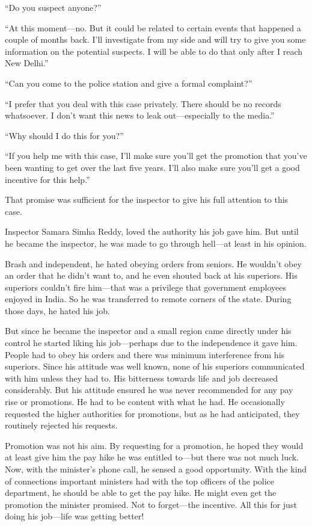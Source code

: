 “Do you suspect anyone?”

“At this moment—no. But it could be related to certain events that happened a
couple of months back. I'll investigate from my side and will try to give you
some information on the potential suspects. I will be able to do that only after
I reach New Delhi.”

“Can you come to the police station and give a formal complaint?”

“I prefer that you deal with this case privately. There should be no records
whatsoever. I don't want this news to leak out—especially to the media.”

“Why should I do this for you?”

“If you help me with this case, I'll make sure you'll get the promotion that
you've been wanting to get over the last five years. I'll also make sure you'll
get a good incentive for this help.”

That promise was sufficient for the inspector to give his full attention to this
case.

Inspector Samara Simha Reddy, loved the authority his job gave him. But until he
became the inspector, he was made to go through hell—at least in his opinion.

Brash and independent, he hated obeying orders from seniors. He wouldn't obey an
order that he didn't want to, and he even shouted back at his superiors.  His
superiors couldn't fire him—that was a privilege that government employees
enjoyed in India. So he was transferred to remote corners of the state.  During
those days, he hated his job.

But since he became the inspector and a small region came directly under his
control he started liking his job—perhaps due to the independence it gave him.
People had to obey his orders and there was minimum interference from his
superiors. Since his attitude was well known, none of his superiors communicated
with him unless they had to. His bitterness towards life and job decreased
considerably. But his attitude ensured he was never recommended for any pay rise
or promotions. He had to be content with what he had. He occasionally requested
the higher authorities for promotions, but as he had anticipated, they routinely
rejected his requests.

Promotion was not his aim. By requesting for a promotion, he hoped they would at
least give him the pay hike he was entitled to—but there was not much luck.
Now, with the minister's phone call, he sensed a good opportunity. With the kind
of connections important ministers had with the top officers of the police
department, he should be able to get the pay hike. He might even get the
promotion the minister promised. Not to forget—the incentive. All this for
just doing his job—life was getting better!